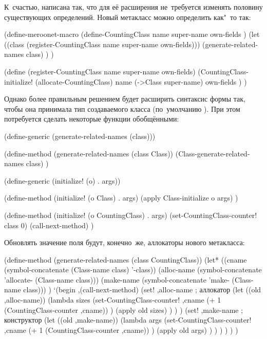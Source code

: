 К~счастью, {\Meroonet} написана так, что для её расширения не~требуется изменять
половину существующих определений. Новый метакласс можно определить как"~то так:

\begin{code:lisp}
(define-meroonet-macro (define-CountingClass name super-name
                                             own-fields )
  (let ((class (register-CountingClass name super-name own-fields)))
    (generate-related-names class) ) )

(define (register-CountingClass name super-name own-fields)
  (CountingClass-initialize! (allocate-CountingClass)
                             name
                             (->Class super-name)
                             own-fields ) )
\end{code:lisp}

Однако более правильным решением будет расширить синтаксис формы
 так, чтобы она принимала тип создаваемого класса (по~умолчанию
). При этом потребуется сделать некоторые функции обобщёнными:

\begin{code:lisp}
(define-generic (generate-related-names (class)))

(define-method (generate-related-names (class Class))
  (Class-generate-related-names class) )

(define-generic (initialize! (o) . args))

(define-method (initialize! (o Class) . args)
  (apply Class-initialize o args) )

(define-method (initialize! (o CountingClass) . args)
  (set-CountingClass-counter! class 0)
  (call-next-method) )
\end{code:lisp}

Обновлять значение поля  будут, конечно~же, аллокаторы нового
метакласса:

\begin{code:lisp}
(define-method (generate-related-names (class CountingClass))
  (let* ((cname      (symbol-concatenate (Class-name class) '-class))
         (alloc-name (symbol-concatenate 'allocate- (Class-name class)))
         (make-name  (symbol-concatenate 'make- (Class-name class))) )
    `(begin ,(call-next-method)
            (set! ,alloc-name                 ; аллокатор
                  (let ((old ,alloc-name))
                    (lambda sizes
                      (set-CountingClass-counter! ,cname
                       (+ 1 (CountingClass-counter ,cname)) )
                      (apply old sizes) ) ) )
            (set! ,make-name                  ; конструктор
                  (let ((old ,make-name))
                    (lambda args
                      (set-CountingClass-counter! ,cname
                       (+ 1 (CountingClass-counter ,cname)) )
                      (apply old args) ) ) ) ) ) )
\end{code:lisp}

